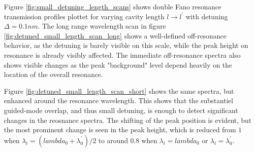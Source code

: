 Figure \ref{fig:small_detuning_length_scans} shows double Fano resonance transmission profiles plottet for varying cavity length $l \rightarrow l^{\prime}$ with detuning $\Delta = 0.1nm$. The long range wavelength scan in figure \ref{fig:detuned_small_length_scan_long} shows a well-defined off-resonance behavior, as the detuning is barely visible on this scale, while the peak height on resonance is already visibly affected. The immediate off-resonance spectra also shows visible changes as the peak "background" level depend heavily on the location of the overall resonance.  

Figure \ref{fig:detuned_small_length_scan_short} shows the same spectra, but enhanced around the resonance wavelength. This shows that the substantiel guided-mode overlap, and thus small detuning, is enough to detect significant changes in the reosnance spectra. The shifting of the peak position is evident, but the most prominent change is seen in the peak height, which is reduced from $1$ when $\lambda_t = (lambda_0 + \lambda_0^{\prime})/2$ to around $0.8$ when $\lambda_t = lambda_0$ or $\lambda_t = \lambda_0^{\prime}$.


